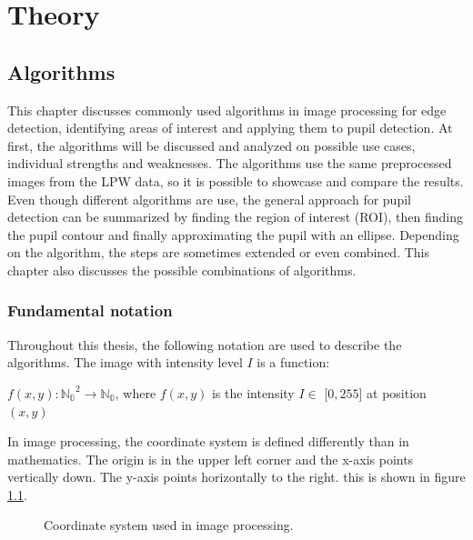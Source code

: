 \chapter{Theory}
\section{Algorithms}
This chapter discusses commonly used algorithms in image processing for edge detection, identifying areas of interest and applying them to pupil detection. At first, the algorithms will be discussed and analyzed on possible use cases, individual strengths and weaknesses. The algorithms use the same preprocessed images from the LPW data, so it is possible to showcase and compare the results. Even though different algorithms are use, the general approach for pupil detection can be summarized by finding the region of interest (ROI), then finding the pupil contour and finally approximating the pupil with an ellipse. Depending on the algorithm, the steps are sometimes extended or even combined. This chapter also discusses the possible combinations of algorithms. 

\subsection{Fundamental notation}\label{subsec:funda}
Throughout this thesis, the following notation are used to describe the algorithms.
The image with intensity level $I$ is a function:

$f(x,y): \mathbb{\mathbb{N_0} }^2 \rightarrow \mathbb{\mathbb{N_0}}$, where $f(x,y)$ is the intensity $I \in $ [$0,255$] at position $(x,y)$

In image processing, the coordinate system is defined differently than in mathematics. The origin is in the upper left corner and the x-axis points vertically down. The y-axis points horizontally to the right. this is shown in figure \ref{fig:coordsystem}.

\begin{figure}[h]
    \centering


    \caption{Coordinate system used in image processing.}
    \label{fig:coordsystem}
\end{figure}

